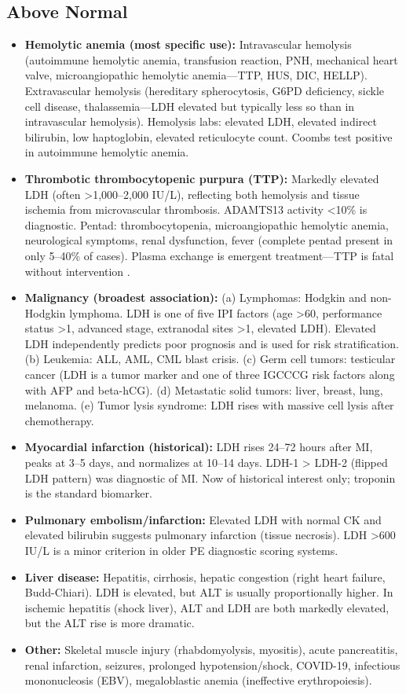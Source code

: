 \subsection*{Above Normal}
\begin{itemize}
  \item \textbf{Hemolytic anemia (most specific use):} Intravascular hemolysis (autoimmune hemolytic anemia, transfusion reaction, PNH, mechanical heart valve, microangiopathic hemolytic anemia---TTP, HUS, DIC, HELLP). Extravascular hemolysis (hereditary spherocytosis, G6PD deficiency, sickle cell disease, thalassemia---LDH elevated but typically less so than in intravascular hemolysis). Hemolysis labs: elevated LDH, elevated indirect bilirubin, low haptoglobin, elevated reticulocyte count. Coombs test positive in autoimmune hemolytic anemia.
  \item \textbf{Thrombotic thrombocytopenic purpura (TTP):} Markedly elevated LDH (often >1,000--2,000 IU/L), reflecting both hemolysis and tissue ischemia from microvascular thrombosis. ADAMTS13 activity <10\% is diagnostic. Pentad: thrombocytopenia, microangiopathic hemolytic anemia, neurological symptoms, renal dysfunction, fever (complete pentad present in only 5--40\% of cases). Plasma exchange is emergent treatment---TTP is fatal without intervention \cite{george2014syndromes}.
  \item \textbf{Malignancy (broadest association):} (a) Lymphomas: Hodgkin and non-Hodgkin lymphoma. LDH is one of five IPI factors (age >60, performance status >1, advanced stage, extranodal sites >1, elevated LDH). Elevated LDH independently predicts poor prognosis and is used for risk stratification. (b) Leukemia: ALL, AML, CML blast crisis. (c) Germ cell tumors: testicular cancer (LDH is a tumor marker and one of three IGCCCG risk factors along with AFP and beta-hCG). (d) Metastatic solid tumors: liver, breast, lung, melanoma. (e) Tumor lysis syndrome: LDH rises with massive cell lysis after chemotherapy.
  \item \textbf{Myocardial infarction (historical):} LDH rises 24--72 hours after MI, peaks at 3--5 days, and normalizes at 10--14 days. LDH-1 > LDH-2 (flipped LDH pattern) was diagnostic of MI. Now of historical interest only; troponin is the standard biomarker.
  \item \textbf{Pulmonary embolism/infarction:} Elevated LDH with normal CK and elevated bilirubin suggests pulmonary infarction (tissue necrosis). LDH >600 IU/L is a minor criterion in older PE diagnostic scoring systems.
  \item \textbf{Liver disease:} Hepatitis, cirrhosis, hepatic congestion (right heart failure, Budd-Chiari). LDH is elevated, but ALT is usually proportionally higher. In ischemic hepatitis (shock liver), ALT and LDH are both markedly elevated, but the ALT rise is more dramatic.
  \item \textbf{Other:} Skeletal muscle injury (rhabdomyolysis, myositis), acute pancreatitis, renal infarction, seizures, prolonged hypotension/shock, COVID-19, infectious mononucleosis (EBV), megaloblastic anemia (ineffective erythropoiesis).
\end{itemize}

